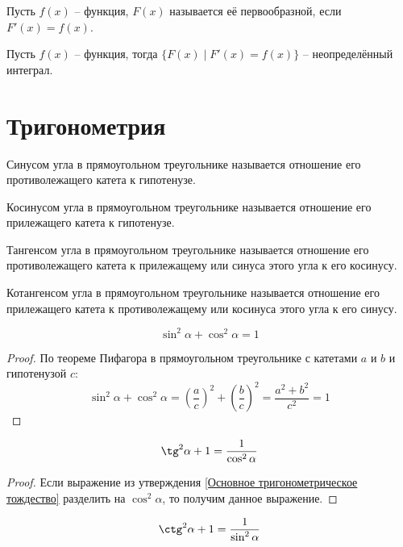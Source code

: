 \documentclass[12pt]{article}
\begin{document}
\begin{definition}
    Пусть $f(x)$ -- функция, $F(x)$ называется её первообразной, если $F'(x)=f(x)$.
\end{definition}
\begin{definition}
    Пусть $f(x)$ -- функция, тогда $\{F(x)\mid F'(x)=f(x)\}$ -- неопределённый интеграл.
\end{definition}

\section{Тригонометрия}

\begin{definition}
    Синусом угла в прямоугольном треугольнике называется отношение его противолежащего катета к гипотенузе.
\end{definition}
\begin{definition}
    Косинусом угла в прямоугольном треугольнике называется отношение его прилежащего катета к гипотенузе.
\end{definition}
\begin{definition}
    Тангенсом угла в прямоугольном треугольнике называется отношение его противолежащего катета к прилежащему или синуса этого угла к его косинусу.
\end{definition}
\begin{definition}
    Котангенсом угла в прямоугольном треугольнике называется отношение его прилежащего катета к противолежащему или косинуса этого угла к его синусу.
\end{definition}
\begin{statement}\label{Основное тригонометрическое тождество}
    $$\sin^2 \alpha + \cos^2 \alpha=1$$
\end{statement}
\begin{proof}
    По теореме Пифагора в прямоугольном треугольнике с катетами $a$ и $b$ и гипотенузой $c$:
    $$\sin^2 \alpha + \cos^2 \alpha=\left(\dfrac{a}{c}\right)^2+\left(\dfrac{b}{c}\right)^2=\dfrac{a^2 + b^2}{c^2}=1$$
\end{proof}
\begin{statement}
    $$\tg^2\alpha + 1=\dfrac{1}{\cos^2 \alpha}$$
\end{statement}
\begin{proof}
    Если выражение из утверждения \ref{Основное тригонометрическое тождество} разделить на $\cos^2 \alpha$, то получим данное выражение.
\end{proof}
\begin{statement}
    $$\ctg^2\alpha + 1=\dfrac{1}{\sin^2 \alpha}$$
\end{statement}
\end{document}
